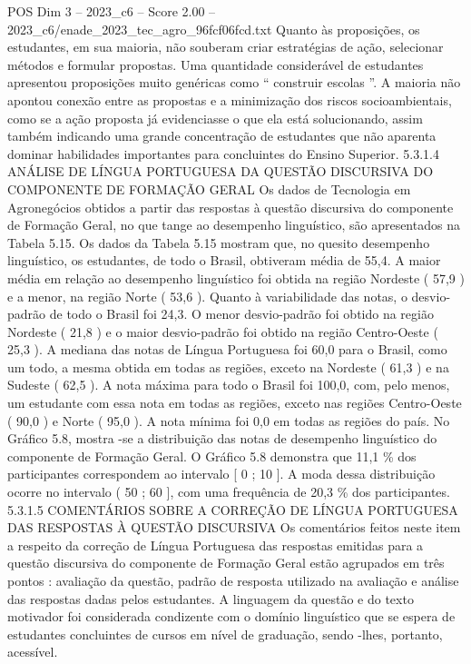 \begin{textsample}{POS Dim 3 – 2023\_c6 – Score 2.00 – 2023\_c6/enade\_2023\_tec\_agro\_96fcf06fcd.txt}
Quanto às proposições, os estudantes, em sua maioria, não souberam criar estratégias de ação, selecionar métodos e formular propostas.
Uma quantidade considerável de estudantes apresentou proposições muito genéricas como “ construir escolas ”.
A maioria não apontou conexão entre as propostas e a minimização dos riscos socioambientais, como se a ação proposta já evidenciasse o que ela está solucionando, assim também indicando uma grande concentração de estudantes que não aparenta dominar habilidades importantes para concluintes do Ensino Superior. 5.3.1.4 ANÁLISE DE LÍNGUA PORTUGUESA DA QUESTÃO DISCURSIVA DO COMPONENTE DE FORMAÇÃO GERAL Os dados de Tecnologia em Agronegócios obtidos a partir das respostas à questão discursiva do componente de Formação Geral, no que tange ao desempenho linguístico, são apresentados na Tabela 5.15.
Os dados da Tabela 5.15 mostram que, no quesito desempenho linguístico, os estudantes, de todo o Brasil, obtiveram média de 55,4.
A maior média em relação ao desempenho linguístico foi obtida na região Nordeste ( 57,9 ) e a menor, na região Norte ( 53,6 ).
Quanto à variabilidade das notas, o desvio-padrão de todo o Brasil foi 24,3.
O menor desvio-padrão foi obtido na região Nordeste ( 21,8 ) e o maior desvio-padrão foi obtido na região Centro-Oeste ( 25,3 ).
A mediana das notas de Língua Portuguesa foi 60,0 para o Brasil, como um todo, a mesma obtida em todas as regiões, exceto na Nordeste ( 61,3 ) e na Sudeste ( 62,5 ).
A nota máxima para todo o Brasil foi 100,0, com, pelo menos, um estudante com essa nota em todas as regiões, exceto nas regiões Centro-Oeste ( 90,0 ) e Norte ( 95,0 ).
A nota mínima foi 0,0 em todas as regiões do país.
No Gráfico 5.8, mostra -se a distribuição das notas de desempenho linguístico do componente de Formação Geral.
O Gráfico 5.8 demonstra que 11,1 \% dos participantes correspondem ao intervalo [ 0 ; 10 ].
A moda dessa distribuição ocorre no intervalo ( 50 ; 60 ], com uma frequência de 20,3 \% dos participantes. 5.3.1.5 COMENTÁRIOS SOBRE A CORREÇÃO DE LÍNGUA PORTUGUESA DAS RESPOSTAS À QUESTÃO DISCURSIVA Os comentários feitos neste item a respeito da correção de Língua Portuguesa das respostas emitidas para a questão discursiva do componente de Formação Geral estão agrupados em três pontos : avaliação da questão, padrão de resposta utilizado na avaliação e análise das respostas dadas pelos estudantes.
A linguagem da questão e do texto motivador foi considerada condizente com o domínio linguístico que se espera de estudantes concluintes de cursos em nível de graduação, sendo -lhes, portanto, acessível.

\end{textsample}
